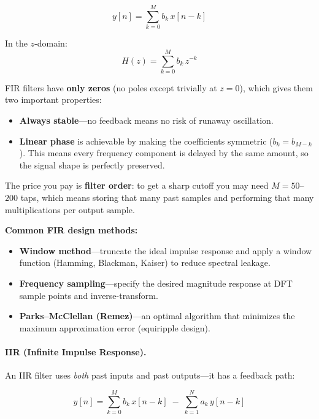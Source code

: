 \begin{equation}
y[n] = \sum_{k=0}^{M} b_k \, x[n-k]
\end{equation}

In the $z$-domain:
\begin{equation}
H(z) = \sum_{k=0}^{M} b_k \, z^{-k}
\end{equation}

FIR filters have \textbf{only zeros} (no poles except trivially at $z = 0$), which
gives them two important properties:
\begin{itemize}
    \item \textbf{Always stable}---no feedback means no risk of runaway oscillation.
    \item \textbf{Linear phase} is achievable by making the coefficients symmetric
          ($b_k = b_{M-k}$). This means every frequency component is delayed by the
          same amount, so the signal shape is perfectly preserved.
\end{itemize}

The price you pay is \textbf{filter order}: to get a sharp cutoff you may need
$M = 50$--$200$ taps, which means storing that many past samples and performing
that many multiplications per output sample.

\textbf{Common FIR design methods:}
\begin{itemize}
    \item \textbf{Window method}---truncate the ideal impulse response and apply a
          window function (Hamming, Blackman, Kaiser) to reduce spectral leakage.
    \item \textbf{Frequency sampling}---specify the desired magnitude response at
          DFT sample points and inverse-transform.
    \item \textbf{Parks--McClellan (Remez)}---an optimal algorithm that minimizes
          the maximum approximation error (equiripple design).
\end{itemize}

\paragraph{IIR (Infinite Impulse Response).}
An IIR filter uses \textit{both} past inputs and past outputs---it has a feedback path:

\begin{equation}
y[n] = \sum_{k=0}^{M} b_k \, x[n-k] \;-\; \sum_{k=1}^{N} a_k \, y[n-k]
\end{equation}

